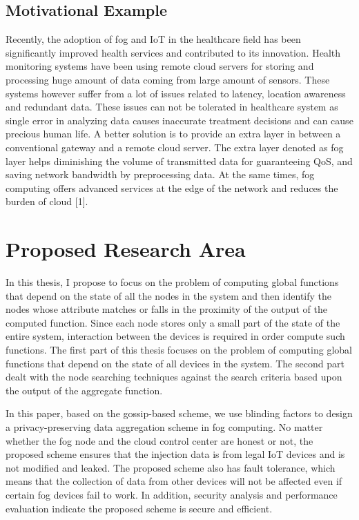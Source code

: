 \documentclass[10pt]{llncs}
\begin{document}
\subsection{Motivational Example}
Recently, the adoption of fog and IoT in the healthcare field has been significantly improved health services and contributed to its innovation. Health monitoring systems have been using remote cloud servers for storing and processing huge amount of data coming from large amount of sensors. These systems however suffer from a lot of issues related to latency, location awareness and redundant data. These issues can not be tolerated in healthcare system as single error in analyzing data causes inaccurate treatment decisions and can cause precious human life. A better solution is to provide an extra layer in between a conventional gateway and a remote cloud server. The extra layer denoted as fog layer helps diminishing the volume of transmitted data for guaranteeing
QoS, and saving network bandwidth by preprocessing data. At the same times, fog computing offers advanced services at the edge of the network and reduces the burden of cloud [1].
 
\section{Proposed Research Area}
%
In this thesis, I propose to focus on the problem of computing global functions that depend on the state of all the nodes in the system and then identify the nodes whose attribute matches or falls in the proximity of the output of the computed function. Since each node stores only a small part of the state of the entire system, interaction between the devices is required in order compute such functions. The first part of this thesis focuses on the problem of computing global functions that depend on the state of all devices in the system. The second part dealt with the node searching techniques against the search criteria based upon the output of the aggregate function.


In this paper, based on the gossip-based scheme, we use blinding factors to design a privacy-preserving data aggregation scheme in fog computing. No matter whether the fog node and the cloud control center are honest or not, the proposed scheme ensures that the injection data is from legal IoT devices and is not modified and leaked. The proposed scheme also has fault tolerance, which means that the collection of data from other devices will not be affected even if certain fog devices fail to work. In addition, security analysis and performance evaluation indicate the proposed scheme is secure and efficient.
\end{document}
